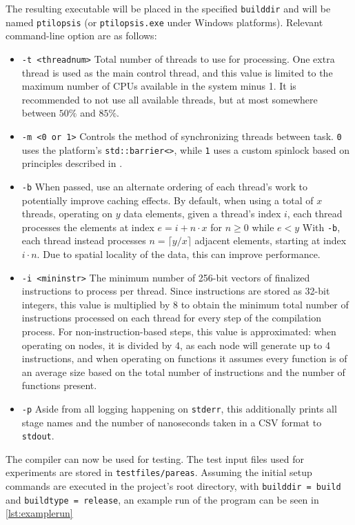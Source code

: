 \documentclass[11pt,dvipsnames]{article}
\newcommand{\icpp}[1]{\texttt{#1}}
\newcommand{\mono}[1]{\texttt{#1}}
\begin{document}
The resulting executable will be placed in the specified \mono{builddir} and will be named \mono{ptilopsis} (or \mono{ptilopsis.exe} under Windows platforms). Relevant command-line option are as follows:
\begin{itemize}
    \item \mono{-t <threadnum>} Total number of threads to use for processing.
        One extra thread is used as the main control thread, and this value is limited to the maximum number of CPUs available in the system minus 1. It is recommended to not use all available threads, but at most somewhere between $50\%$ and $85\%$.
    \item \mono{-m <0 or 1>} Controls the method of synchronizing threads between task. \mono{0} uses the platform's \icpp{std::barrier<>}, while \mono{1} uses a custom spinlock based on principles described in \cite{spinlock}.
    \item \mono{-b} When passed, use an alternate ordering of each thread's work to potentially improve caching effects.
    By default, when using a total of $x$ threads, operating on $y$ data elements, given a thread's index $i$, each thread processes the elements at index $e = i + n \cdot x$ for $n \geq 0$ while $e < y$
    With \mono{-b}, each thread instead processes $n = \lceil y / x \rceil$ adjacent elements, starting at index $i \cdot n$. Due to spatial locality of the data, this can improve performance.
    \item \mono{-i <mininstr>} The minimum number of 256-bit vectors of finalized instructions to process per thread. Since instructions are stored as 32-bit integers, this value is multiplied by 8 to obtain the minimum total number of instructions processed on each thread for every step of the compilation process. For non-instruction-based steps, this value is approximated: when operating on nodes, it is divided by 4, as each node will generate up to 4 instructions, and when operating on functions it assumes every function is of an average size based on the total number of instructions and the number of functions present.
    \item \mono{-p} Aside from all logging happening on \mono{stderr}, this additionally prints all stage names and the number of nanoseconds taken in a CSV format to \mono{stdout}.
\end{itemize}

The compiler can now be used for testing. The test input files used for experiments are stored in \mono{testfiles/pareas}. Assuming the initial setup commands are executed in the project's root directory, with  \mono{builddir = build} and \mono{buildtype = release}, an example run of the program can be seen in \autoref{lst:examplerun}
\end{document}

